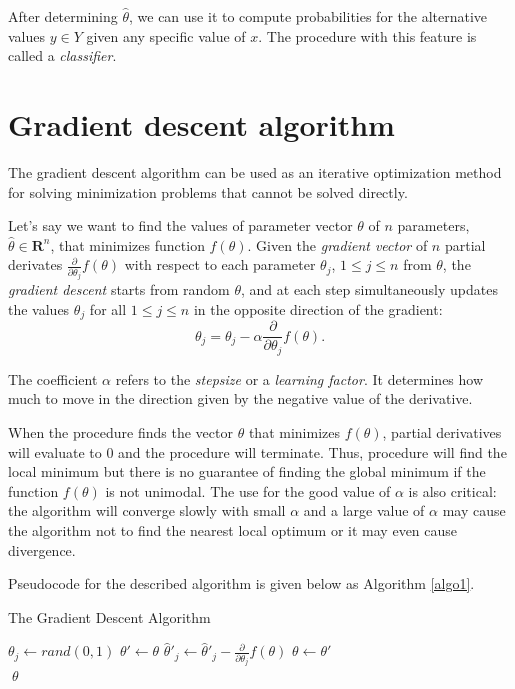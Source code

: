 \documentclass[times, utf8, zavrsni]{fer}
\begin{document}
After determining $\hat\theta$, we can use it to compute probabilities for the alternative values $y \in Y$ given any specific value of $x$. The procedure with this feature is called a \emph{classifier}.

\section{Gradient descent algorithm}

The gradient descent algorithm can be used as an iterative optimization method for solving minimization problems that cannot be solved directly.

Let's say we want to find the values of parameter vector $\theta$ of $n$  parameters, $\hat \theta \in \mathbf{R}^n$, that minimizes function $f(\theta)$. Given the \emph{gradient vector} of $n$ partial derivates $\frac{\partial}{\partial \theta_j} f(\theta)$  with respect to each parameter $\theta_j$, $1 \le j \le n$ from $\theta$, the \emph{gradient descent} starts  from random $\theta$, and at each step simultaneously updates the values $\theta_j$ for all $1 \le j \le n$ in the opposite direction of the gradient:
\begin{equation}
\theta_j = \theta_j - \alpha \frac{\partial}{\partial \theta_j} f(\theta).
\end{equation}

The coefficient $\alpha$ refers to the \emph{stepsize} or a \emph{learning factor}. It  determines how much to move in the direction given by the negative value of the derivative.

When the procedure finds the vector $\theta$ that minimizes $f(\theta)$, partial derivatives will evaluate to $0$ and the procedure will terminate. Thus, procedure will find the local minimum but there is no guarantee of finding the global minimum if the function $f(\theta)$ is not unimodal. The use for the good value of $\alpha$ is also critical: the algorithm will converge slowly with small $\alpha$ and  a large value of $\alpha$ may cause the algorithm not to find the nearest local optimum or it may even cause divergence. 

Pseudocode for the described algorithm is given below as Algorithm \ref{algo1}.  
\begin{algorithm} 
\caption{The Gradient Descent Algorithm}
\label{algo1}
\begin{algorithmic}
    \State $\theta_j \gets rand(0, 1)$
\EndFor
\Repeat
\State $\theta' \gets \theta$
\State $\hat \theta'_j \gets \hat \theta'_j - \frac{\partial}{\partial \theta_j}f(\theta)$  
\EndFor
\State $\theta  \gets \theta'$    
 \\
\Return $\; \theta$
\end{algorithmic}
\end{algorithm}
\end{document}

